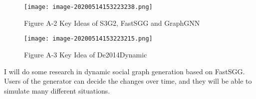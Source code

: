 \begin{survey}
\begin{figure}
  \label{survey:Brief1}
  \centering
  \texttt{[image: image-20200514153223238.png]}
  \caption*{Figure A-2  Key Ideas of S3G2, FastSGG and GraphGNN}
\end{figure}

\begin{figure}
  \label{survey:Brief2}
  \centering
  \texttt{[image: image-20200514153223215.png]}
  \caption*{Figure A-3  Key Idea of De2014Dynamic}
\end{figure}

I will do some research in dynamic social graph generation based on
FastSGG. Users of the generator can decide the changes over time, and
they will be able to simulate many different situations.





\end{survey}
